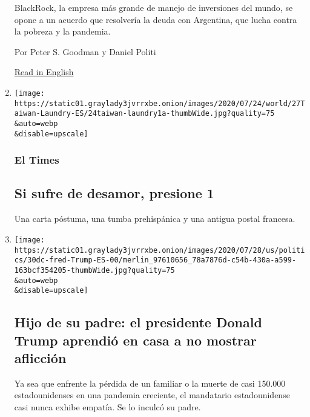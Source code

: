 \begin{enumerate}
  BlackRock, la empresa más grande de manejo de inversiones del mundo,
  se opone a un acuerdo que resolvería la deuda con Argentina, que lucha
  contra la pobreza y la pandemia.

  Por Peter S. Goodman y Daniel Politi

  \href{https://www.nytimes3xbfgragh.onion/2020/07/31/business/argentina-debt.html}{Read
  in English}
\item
  \href{/es/2020/07/31/espanol/elecciones-2020-trump-mexico-violencia.html}{}

  \texttt{[image: https://static01.graylady3jvrrxbe.onion/images/2020/07/24/world/27Taiwan-Laundry-ES/24taiwan-laundry1a-thumbWide.jpg?quality=75\\\&auto=webp\\\&disable=upscale]}

  \hypertarget{el-times-1}{%
  \subsubsection{El Times}\label{el-times-1}}

  \hypertarget{si-sufre-de-desamor-presione-1}{%
  \subsection{Si sufre de desamor, presione
  1}\label{si-sufre-de-desamor-presione-1}}

  Una carta póstuma, una tumba prehispánica y una antigua postal
  francesa.
\item
  \href{/es/2020/07/31/espanol/estados-unidos/fred-trump-donald-trump.html}{}

  \texttt{[image: https://static01.graylady3jvrrxbe.onion/images/2020/07/28/us/politics/30dc-fred-Trump-ES-00/merlin\_97610656\_78a7876d-c54b-430a-a599-163bcf354205-thumbWide.jpg?quality=75\\\&auto=webp\\\&disable=upscale]}

  \hypertarget{hijo-de-su-padre-el-presidente-donald-trump-aprendiuxf3-en-casa-a-no-mostrar-aflicciuxf3n}{%
  \subsection{Hijo de su padre: el presidente Donald Trump aprendió en
  casa a no mostrar
  aflicción}\label{hijo-de-su-padre-el-presidente-donald-trump-aprendiuxf3-en-casa-a-no-mostrar-aflicciuxf3n}}

  Ya sea que enfrente la pérdida de un familiar o la muerte de casi
  150.000 estadounidenses en una pandemia creciente, el mandatario
  estadounidense casi nunca exhibe empatía. Se lo inculcó su padre.


\end{enumerate}
